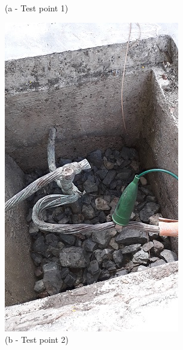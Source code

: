 \begin{figure}
\begin{minipage}[b]{0.22\linewidth}
	\caption*{(a - Test point 1)}
\end{minipage}
\hspace{0.03cm}
\begin{minipage}[b]{0.22\linewidth}
	\centering
	\includegraphics[width=\textwidth]{figures/R1P_grounding/grounding2.jpg}
	\caption*{(b - Test point 2)}
	

\end{minipage}
\end{figure}
